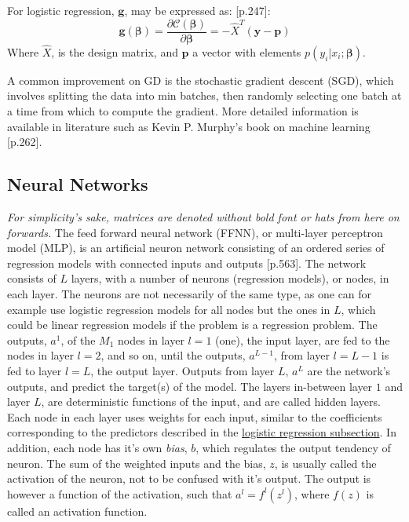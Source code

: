 \documentclass[%
oneside,                 %
final,                   %
10pt]{article}
\begin{document}
For logistic regression, $\bm g$, may be expressed as: \citep{MLMurphy}[p.247]:
\begin{equation}
\bm g (\bm \beta)= \frac{\partial \mathcal{C}(\bm{\beta})}{\partial \bm \beta}= -\hat{X}^T(\bm y-\bm p )
\end{equation}
Where $\hat{X}$, is the design matrix, and $\bm p$ a vector with elements $p(y_i|x_i;\bm \beta)$. \newline

A common improvement on GD is the stochastic gradient descent (SGD), which involves splitting the data into min batches, then randomly selecting one batch at a time from which to compute the gradient. More detailed information is available in literature such as Kevin P. Murphy's book on machine learning \citep{MLMurphy}[p.262].

\subsection{Neural Networks} \label{Section_M_NN}
\textit{For simplicity's sake, matrices are denoted without bold font or hats from here on forwards.} The feed forward neural network (FFNN), or multi-layer perceptron model (MLP), is an artificial neuron network consisting of an ordered series of regression models with connected inputs and outputs \citep{MLMurphy}[p.563]. The network consists of $L$ layers, with  a number of neurons (regression models), or nodes, in each layer. The neurons are not necessarily of the same type, as one can for example use logistic regression models for all nodes but the ones in $L$, which could be linear regression models if the problem is a regression problem. The outputs, $a^1$, of the $M_1$ nodes in layer $l=1$ (one), the input layer, are fed to the nodes in layer $l=2$, and so on, until the outputs, $a^{L-1}$, from layer $l=L-1$ is fed to layer $l=L$, the output layer. Outputs from layer $L$, $a^L$ are the network's outputs, and predict the target(s) of the model. The layers in-between layer $1$ and layer $L$, are deterministic functions of the input, and are called hidden layers.  Each node in each layer uses weights for each input, similar to the coefficients  corresponding to the predictors described in the \hyperref[Section_M_Logreg]{logistic regression subsection}. In addition, each node has it's own \textit{bias}, $b$, which regulates the output tendency of neuron. The sum of the weighted inputs and the bias, $z$, is usually called the activation of the neuron, not to be confused with it's output. The output is however a function of the activation, such that $a^l=f^l(z^l)$, where $f(z)$ is called an activation function. \newline
\end{document}
